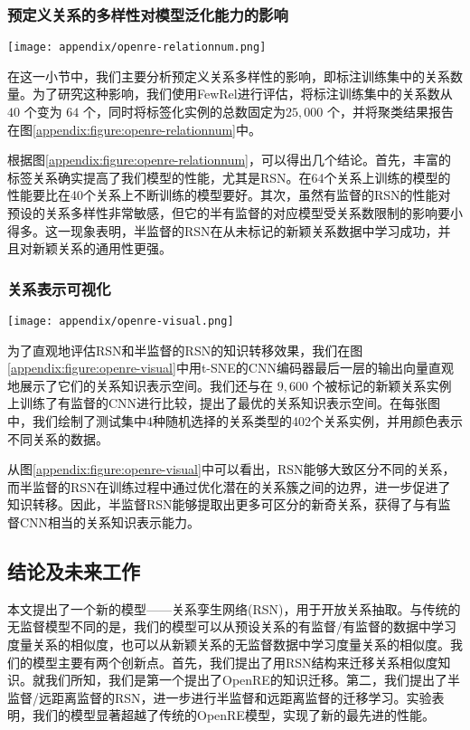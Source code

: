 \begin{translation}
\subsubsection{预定义关系的多样性对模型泛化能力的影响}
\begin{figure*}
	\texttt{[image: appendix/openre-relationnum.png]}
	\caption{训练集中预定义关系数量与聚类结果的对应图}
	\label{appendix:figure:openre-relationnum}
\end{figure*}

在这一小节中，我们主要分析预定义关系多样性的影响，即标注训练集中的关系数量。为了研究这种影响，我们使用FewRel进行评估，将标注训练集中的关系数从 $40$ 个变为 $64$ 个，同时将标签化实例的总数固定为$25,000$ 个，并将聚类结果报告在图\ref{appendix:figure:openre-relationnum}中。

根据图\ref{appendix:figure:openre-relationnum}，可以得出几个结论。首先，丰富的标签关系确实提高了我们模型的性能，尤其是RSN。在64个关系上训练的模型的性能要比在40个关系上不断训练的模型要好。其次，虽然有监督的RSN的性能对预设的关系多样性非常敏感，但它的半有监督的对应模型受关系数限制的影响要小得多。这一现象表明，半监督的RSN在从未标记的新颖关系数据中学习成功，并且对新颖关系的通用性更强。


\subsubsection{关系表示可视化}
\begin{figure*}
	\texttt{[image: appendix/openre-visual.png]}
	\caption{CNN模块输出的向量的t-SNE可视化。（a）关系孪生网络；（b）半监督关系孪生网络；（c）经典的有监督关系抽取模型。所有的图都显示了4种新型关系的402个实例的聚类结果。}
	\label{appendix:figure:openre-visual}
\end{figure*}

为了直观地评估RSN和半监督的RSN的知识转移效果，我们在图\ref{appendix:figure:openre-visual}中用t-SNE的CNN编码器最后一层的输出向量直观地展示了它们的关系知识表示空间。我们还与在 $9,600$ 个被标记的新颖关系实例上训练了有监督的CNN进行比较，提出了最优的关系知识表示空间。在每张图中，我们绘制了测试集中4种随机选择的关系类型的402个关系实例，并用颜色表示不同关系的数据。

从图\ref{appendix:figure:openre-visual}中可以看出，RSN能够大致区分不同的关系，而半监督的RSN在训练过程中通过优化潜在的关系簇之间的边界，进一步促进了知识转移。因此，半监督RSN能够提取出更多可区分的新奇关系，获得了与有监督CNN相当的关系知识表示能力。

\subsection{结论及未来工作}
本文提出了一个新的模型——关系孪生网络(RSN)，用于开放关系抽取。与传统的无监督模型不同的是，我们的模型可以从预设关系的有监督/有监督的数据中学习度量关系的相似度，也可以从新颖关系的无监督数据中学习度量关系的相似度。我们的模型主要有两个创新点。首先，我们提出了用RSN结构来迁移关系相似度知识。就我们所知，我们是第一个提出了OpenRE的知识迁移。第二，我们提出了半监督/远距离监督的RSN，进一步进行半监督和远距离监督的迁移学习。实验表明，我们的模型显著超越了传统的OpenRE模型，实现了新的最先进的性能。


\end{translation}
